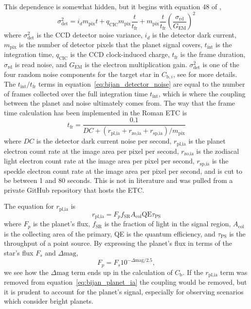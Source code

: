 This dependence is somewhat hidden, but it begins with equation 48 of \citet{Nemati2020a},
\begin{equation}
  \sigma_{\textrm{det}}^2 = i_d m_{\textrm{pix}} t + q_\textrm{CIC} m_{\textrm{pix}} \frac{t}{t_{\textrm{fr}}}
  + m_{\textrm{pix}} \frac{t}{t_{\textrm{fr}}} \left( \frac{\sigma_{\textrm{rd}}}{G_{\textrm{EM}}}\right)^2
 \label{eq:bijan_detector_noise}
\end{equation}
where $\sigma_{\textrm{det}}^2$ is the CCD detector noise variance, $i_d$ is
the detector dark current, $m_{\textrm{pix}}$ is the number of detector pixels
that the planet signal covers, $t_\textrm{int}$ is the integration time, $q_{\textrm{CIC}}$
is the CCD clock-induced charge, $t_{\textrm{fr}}$ is the frame duration,
$\sigma_{\textrm{rd}}$ is read noise, and $G_{\textrm{EM}}$ is the electron
multiplication gain. $\sigma_{\textrm{det}}^2$ is one of the four random
noise components for the target star in $C_{\textrm{b},i}$, see \citet{Nemati2020a} for more details.
The $t_\textrm{int}/t_{\textrm{fr}}$ terms in equation~\ref{eq:bijan_detector_noise} are
equal to the number of frames collected over the full integration time $t_\textrm{int}$,
which is where the coupling between the planet and noise ultimately comes from.
The way that the frame time calculation has been implemented in the Roman ETC
is
\begin{equation}
  t_{\textrm{fr}} = \frac{0.1}{DC +\left(r_{\textrm{pl,ia}}+r_{\textrm{zo,ia}}+r_{\textrm{sp,ia}}\right)/m_{\textrm{pix}}}
  \label{eq:bijan_frame_duration}
\end{equation}
where $DC$ is the detector dark current noise per second, $r_{\textrm{pl,ia}}$ is
the planet electron count rate at the image area per pixel per second,
$r_{\textrm{zo,ia}}$ is the zodiacal light electron count rate at the image area
per pixel per second, $r_{\textrm{sp,ia}}$ is the speckle electron count rate at
the image area per pixel per second, and is cut to be between 1 and 80 seconds. This
is not in literature and was pulled from a private GitHub repository that hosts the
ETC.

The equation for $r_{\textrm{pl,ia}}$ is
\begin{equation}
  r_{\textrm{pl,ia}} = F_p f_{\textrm{SR}} A_{\textrm{col}} \textrm{QE} \tau_{\textrm{PS}}
  \label{eq:bijan_planet_ia}
\end{equation}
where $F_p$ is the planet's flux, $f_{\textrm{SR}}$ is the fraction of light in
the signal region, $A_{\textrm{col}}$ is the collecting area of the primary, QE
is the quantum efficiency, and $\tau_{\textrm{PS}}$ is the throughput of a
point source. By expressing the planet's flux in terms of the star's flux $F_s$
and $\Delta\textrm{mag}$,
\begin{equation}
  F_p = F_s 10^{-\Delta\textrm{mag}/2.5},
  \label{eq:fp_dmag}
\end{equation}
we see how the $\Delta\textrm{mag}$ term ends up in the calculation of
$C_{\textrm{b}}$. If the $r_{\textrm{pl,ia}}$ term was removed from
equation~\ref{eq:bijan_planet_ia} the coupling would be removed, but it is
prudent to account for the planet's signal, especially for observing scenarios
which consider bright planets.

